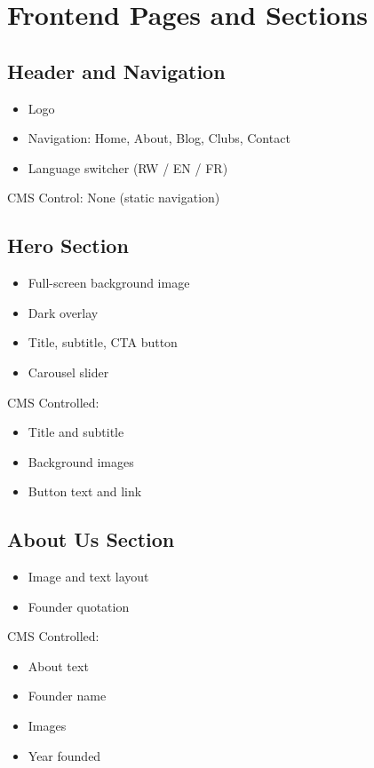 \documentclass[12pt,a4paper]{article}
\begin{document}
\section{Frontend Pages and Sections}

\subsection{Header and Navigation}
\begin{itemize}
    \item Logo
    \item Navigation: Home, About, Blog, Clubs, Contact
    \item Language switcher (RW / EN / FR)
\end{itemize}

CMS Control: None (static navigation)

\subsection{Hero Section}
\begin{itemize}
    \item Full-screen background image
    \item Dark overlay
    \item Title, subtitle, CTA button
    \item Carousel slider
\end{itemize}

CMS Controlled:
\begin{itemize}
    \item Title and subtitle
    \item Background images
    \item Button text and link
\end{itemize}

\subsection{About Us Section}
\begin{itemize}
    \item Image and text layout
    \item Founder quotation
\end{itemize}

CMS Controlled:
\begin{itemize}
    \item About text
    \item Founder name
    \item Images
    \item Year founded
\end{itemize}
\end{document}
